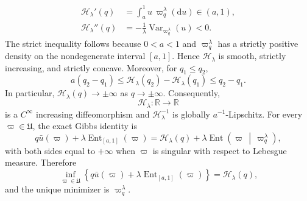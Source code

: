\documentclass[11pt]{article}
\def\R{\mathbb{R}}
\newcommand{\dd}{\mathrm{d}}
\newcommand{\Ent}{\operatorname{Ent}}
\theoremstyle{definition}
\theoremstyle{remark}
\numberwithin{equation}{section}
\begin{document}
\begin{align}
 \mathscr H_\lambda'(q)
 &=\int_a^1u\,\varpi_q^\lambda(\dd u)\in(a,1),
 \label{eq:H-prime}\\
 \mathscr H_\lambda''(q)
 &=-\frac1\lambda\operatorname{Var}_{\varpi_q^\lambda}(u)<0.
 \label{eq:H-second}
\end{align}
The strict inequality follows because $0<a<1$ and $\varpi_q^\lambda$ has a strictly positive
density on the nondegenerate interval $[a,1]$.  Hence $\mathscr H_\lambda$ is smooth, strictly
increasing, and strictly concave.  Moreover, for $q_1\le q_2$,
\begin{equation}\label{eq:H-uniform-ellipticity}
 a(q_2-q_1)
 \le \mathscr H_\lambda(q_2)-\mathscr H_\lambda(q_1)
 \le q_2-q_1.
\end{equation}
In particular, $\mathscr H_\lambda(q)\to\pm\infty$ as $q\to\pm\infty$.
Consequently,
\begin{equation}\label{eq:H-diffeomorphism}
 \mathscr H_\lambda:\R\longrightarrow\R
\end{equation}
is a $C^\infty$ increasing diffeomorphism and
$\mathscr H_\lambda^{-1}$ is globally $a^{-1}$-Lipschitz.
For every $\varpi\in\mathfrak U$, the exact Gibbs identity is
\begin{equation}\label{eq:gibbs-relative-entropy}
 q\bar u(\varpi)+\lambda\Ent_{[a,1]}(\varpi)
 =\mathscr H_\lambda(q)
 +\lambda\Ent\!\left(\varpi\,\middle|\,\varpi_q^\lambda\right),
\end{equation}
with both sides equal to $+\infty$ when $\varpi$ is singular with respect to Lebesgue measure.
Therefore
\begin{equation}\label{eq:gibbs-variational}
 \inf_{\varpi\in\mathfrak U}
 \left\{q\bar u(\varpi)+\lambda\Ent_{[a,1]}(\varpi)\right\}
 =\mathscr H_\lambda(q),
\end{equation}
and the unique minimizer is $\varpi_q^\lambda$.
\end{document}
